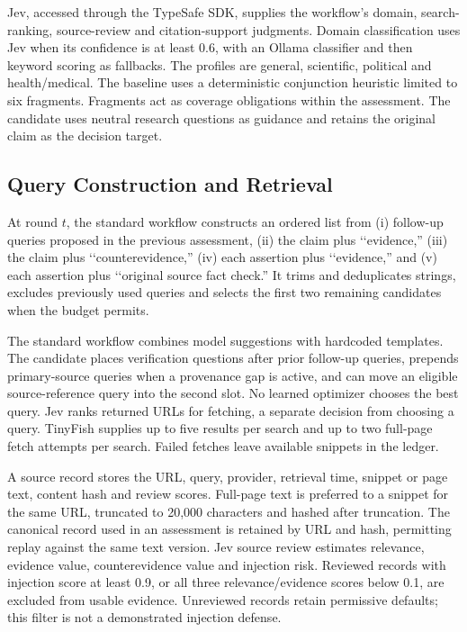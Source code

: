 \documentclass[conference]{IEEEtran}
\begin{document}
Jev, accessed through the TypeSafe SDK, supplies the workflow's domain, search-ranking, source-review and citation-support judgments. Domain classification uses Jev when its confidence is at least 0.6, with an Ollama classifier and then keyword scoring as fallbacks. The profiles are general, scientific, political and health/medical. The baseline uses a deterministic conjunction heuristic limited to six fragments. Fragments act as coverage obligations within the assessment. The candidate uses neutral research questions as guidance and retains the original claim as the decision target.

\subsection{Query Construction and Retrieval}
At round $t$, the standard workflow constructs an ordered list from (i) follow-up queries proposed in the previous assessment, (ii) the claim plus \lq\lq evidence,'' (iii) the claim plus \lq\lq counterevidence,'' (iv) each assertion plus \lq\lq evidence,'' and (v) each assertion plus \lq\lq original source fact check.'' It trims and deduplicates strings, excludes previously used queries and selects the first two remaining candidates when the budget permits.

The standard workflow combines model suggestions with hardcoded templates. The candidate places verification questions after prior follow-up queries, prepends primary-source queries when a provenance gap is active, and can move an eligible source-reference query into the second slot. No learned optimizer chooses the best query. Jev ranks returned URLs for fetching, a separate decision from choosing a query. TinyFish supplies up to five results per search and up to two full-page fetch attempts per search. Failed fetches leave available snippets in the ledger.

A source record stores the URL, query, provider, retrieval time, snippet or page text, content hash and review scores. Full-page text is preferred to a snippet for the same URL, truncated to 20,000 characters and hashed after truncation. The canonical record used in an assessment is retained by URL and hash, permitting replay against the same text version. Jev source review estimates relevance, evidence value, counterevidence value and injection risk. Reviewed records with injection score at least 0.9, or all three relevance/evidence scores below 0.1, are excluded from usable evidence. Unreviewed records retain permissive defaults; this filter is not a demonstrated injection defense.
\end{document}
